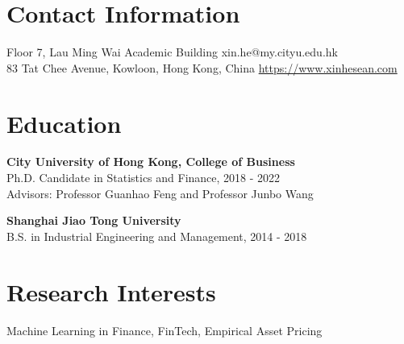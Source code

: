 \documentclass[margin]{res}
\begin{document}
\begin{resume}




\section{\sc Contact Information}
	Floor 7, Lau Ming Wai Academic Building	   \hfill xin.he@my.cityu.edu.hk\\        
	83 Tat Chee Avenue, Kowloon, Hong Kong, China 	\hfill   \url{https://www.xinhesean.com} \\

\vspace{5mm}

\section{\sc Education}
\textbf{City University of Hong Kong, College of Business}\\
{Ph.D. Candidate in Statistics and Finance, 2018 - 2022}\\
Advisors: Professor Guanhao Feng and Professor Junbo Wang

\textbf{Shanghai Jiao Tong University}\\
{B.S. in Industrial Engineering and Management, 2014 - 2018}

\vspace{5mm}

\section{\sc Research Interests}
{Machine Learning in Finance, FinTech, Empirical Asset Pricing}


\end{resume}
\end{document}
